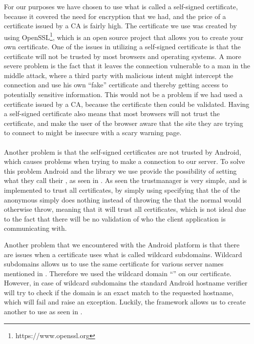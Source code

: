 For our purposes we have chosen to use what is called a self-signed certificate, because it covered the need for encryption that we had, and the price of a certificate issued by a CA is fairly high. The certificate we use was created by using OpenSSL\footnote{https://www.openssl.org}, which is an open source project that allows you to create your own certificate. One of the issues in utilizing a self-signed certificate is that the certificate will not be trusted by most browsers and operating systems. A more severe problem is the fact that it leaves the connection vulnerable to a man in the middle attack, where a third party with malicious intent might intercept the connection and use his own ``fake'' certificate and thereby getting access to potentially sensitive information. This would not be a problem if we had used a certificate issued by a CA, because the certificate then could be validated. Having a self-signed certificate also means that most browsers will not trust the certificate, and make the user of the browser aware that the site they are trying to connect to might be insecure with a scary warning page. 
\\\\
Another problem is that the self-signed certificates are not trusted by Android, which causes problems when trying to make a connection to our server. To solve this problem Android and the library we use provide the possibility of setting what they call their , as seen in . As seen the trustmanager is very simple, and is implemented to trust all certificates, by simply using specifying that the  of the anonymous simply does nothing instead of throwing the  that the normal  would otherwise throw, meaning that it will trust all certificates, which is not ideal due to the fact that there will be no validation of who the client application is communicating with. 


\FloatBarrier

Another problem that we encountered with the Android platform is that there are issues when a certificate uses what is called wildcard subdomains. Wildcard subdomains allows us to use the same certificate for various server names mentioned in . Therefore we used the wildcard domain ``'' on our certificate. However, in case of wildcard subdomains the standard Android hostname verifier will try to check if the domain is an exact match to the requested hostname, which will fail and raise an exception. Luckily, the framework allows us to create another to use as seen in .

